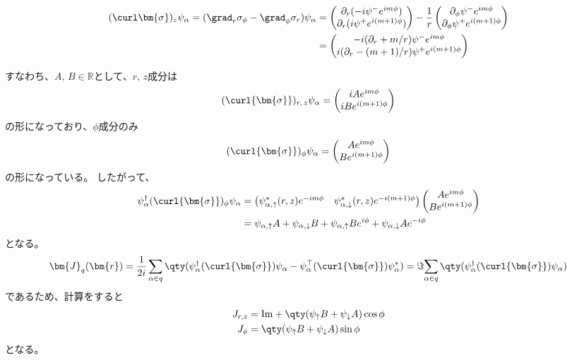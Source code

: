 \documentclass[a4paper,11pt,uplatex]{jsarticle}%
\begin{document}
\begin{align}
  (\curl\bm{\sigma})_{z}\psi_{\alpha} = (\grad_{r}\sigma_{\phi} - \grad_{\phi}\sigma_{r})\psi_{\alpha}
   & =
  \begin{pmatrix}
    \partial_{r}(-i\psi^{-}e^{im\phi}) \\
    \partial_{r}(i\psi^{+}e^{i(m+1)\phi})
  \end{pmatrix}
  -\frac{1}{r}
  \begin{pmatrix}
    \partial_{\phi}\psi^{-}e^{im\phi} \\
    \partial_{\phi}\psi^{+}e^{i(m+1)\phi}
  \end{pmatrix} \\
   & =
  \begin{pmatrix}
    -i(\partial_r + m/r)\psi^{-}e^{im\phi} \\
    i(\partial_r - (m+1)/r)\psi^{+}e^{i(m+1)\phi}
  \end{pmatrix}
\end{align}

すなわち、$A,\,B\in \mathbb{R}$として、$r,\,z$成分は
\begin{equation}
  (\curl{\bm{\sigma}})_{r,\,z}\psi_{\alpha} = 
  \begin{pmatrix}
    iAe^{im\phi} \\
    iBe^{i(m+1)\phi}
  \end{pmatrix}
\end{equation}
の形になっており、$\phi$成分のみ
\begin{equation}
  (\curl{\bm{\sigma}})_{\phi}\psi_{\alpha} = 
  \begin{pmatrix}
    Ae^{im\phi} \\
    Be^{i(m+1)\phi}
  \end{pmatrix}
\end{equation}
の形になっている。
したがって、
\begin{align}
  \psi^{\dagger}_{\alpha}(\curl{\bm{\sigma}})_{\phi}\psi_{\alpha} &= 
  \begin{pmatrix}
    \psi^*_{\alpha,\uparrow}(r,z)e^{-im\phi} & \psi^*_{\alpha,\downarrow}(r,z)e^{-i(m+1)\phi}
  \end{pmatrix} 
  \begin{pmatrix}
    Ae^{im\phi} \\
    Be^{i(m+1)\phi}
  \end{pmatrix} \\
  &= \psi_{\alpha,\uparrow}A + \psi_{\alpha,\downarrow}B + \psi_{\alpha,\uparrow}Be^{i\phi} + \psi_{\alpha,\downarrow}Ae^{-i\phi}
\end{align}
となる。
\begin{equation}
  \bm{J}_q(\bm{r}) = \frac{1}{2i}\sum_{\alpha\in q}\qty(\psi^{\dagger}_{\alpha}(\curl{\bm{\sigma}})\psi_{\alpha} - \psi^{\top}_{\alpha}(\curl{\bm{\sigma}})\psi_{\alpha}^*) 
  = \Im{\sum_{\alpha\in q}\qty(\psi^{\dagger}_{\alpha}(\curl{\bm{\sigma}})\psi_{\alpha})}
\end{equation}
であるため、計算をすると
\begin{align}
  J_{r,z} &= \text{Im} + \qty(\psi_{\uparrow}B + \psi_{\downarrow}A)\cos\phi \\
  J_{\phi} &= \qty(\psi_{\uparrow}B + \psi_{\downarrow}A)\sin\phi
\end{align}
となる。
\end{document}
